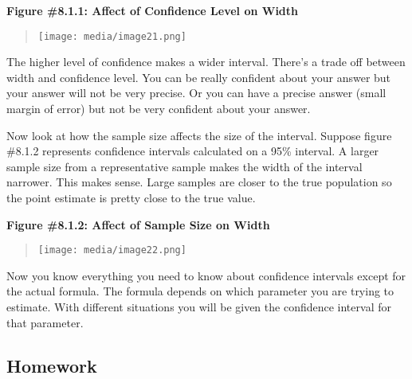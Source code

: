 \documentclass[]{book}
\begin{document}
\textbf{Figure \#8.1.1: Affect of Confidence Level on Width}

\begin{quote}
\texttt{[image: media/image21.png]}
\end{quote}

The higher level of confidence makes a wider interval. There's a trade
off between width and confidence level. You can be really confident
about your answer but your answer will not be very precise. Or you can
have a precise answer (small margin of error) but not be very confident
about your answer.

Now look at how the sample size affects the size of the interval.
Suppose figure \#8.1.2 represents confidence intervals calculated on a
95\% interval. A larger sample size from a representative sample makes
the width of the interval narrower. This makes sense. Large samples are
closer to the true population so the point estimate is pretty close to
the true value.

\textbf{Figure \#8.1.2: Affect of Sample Size on Width}

\begin{quote}
\texttt{[image: media/image22.png]}
\end{quote}

Now you know everything you need to know about confidence intervals
except for the actual formula. The formula depends on which parameter
you are trying to estimate. With different situations you will be given
the confidence interval for that parameter.

\hypertarget{homework-23}{%
\subsection{Homework}\label{homework-23}}
\end{document}
